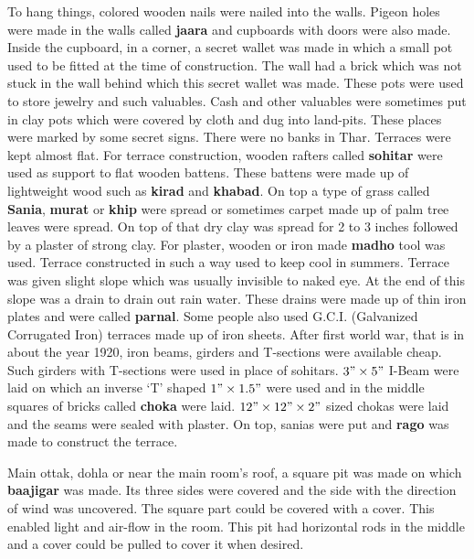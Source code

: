 To hang things, colored wooden nails were nailed into the walls. Pigeon holes
were made in the walls called \textbf{jaara} and cupboards with doors were also
made. Inside the cupboard, in a corner, a secret wallet was made in which a
small pot used to be fitted at the time of construction. The wall had a brick
which was not stuck in the wall behind which this secret wallet was made. These
pots were used to store jewelry and such valuables. Cash and other valuables
were sometimes put in clay pots which were covered by cloth and dug into
land-pits. These places were marked by some secret signs. There were no banks in
Thar. 
Terraces were kept almost flat. For terrace construction, wooden rafters called
\textbf{sohitar} were used as support to flat wooden battens. These battens
were made up of lightweight wood such as \textbf{kirad} and \textbf{khabad}. On
top a type of grass called \textbf{Sania}, \textbf{murat} or \textbf{khip} were
spread or sometimes carpet made up of palm tree leaves were spread. On top of
that dry clay was spread for 2 to 3 inches followed by a plaster of strong
clay. For plaster, wooden or iron made \textbf{madho} tool was used. Terrace
constructed in such a way used to keep cool in summers. Terrace was given
slight slope which was usually invisible to naked eye. At the end of this slope
was a drain to drain out rain water. These drains were made up of thin iron
plates and were called \textbf{parnal}. Some people also used G.C.I.
(Galvanized Corrugated Iron) terraces made up of iron sheets.  After first
world war, that is in about the year 1920, iron beams, girders and T-sections
were available cheap. Such girders with T-sections were used in place of
sohitars. $3" \times 5"$ I-Beam were laid on which an inverse `T' shaped $1"
\times 1.5"$ were used and in the middle squares of bricks called
\textbf{choka} were laid. $12" \times 12" \times 2"$ sized chokas were laid and
the seams were sealed with plaster. On top, sanias were put and \textbf{rago}
was made to construct the terrace.

Main ottak, dohla or near the main room's roof, a square pit was made on which
\textbf{baajigar} was made. Its three sides were covered and the side with the
direction of wind was uncovered. The square part could be covered with a cover.
This enabled light and air-flow in the room. This pit had horizontal rods in the
middle and a cover could be pulled to cover it when desired.

